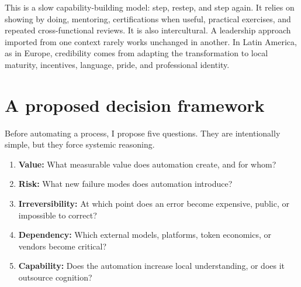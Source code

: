 \documentclass[11pt,a4paper]{article}
\begin{document}
This is a slow capability-building model: step, restep, and step again. It relies on showing by doing, mentoring, certifications when useful, practical exercises, and repeated cross-functional reviews. It is also intercultural. A leadership approach imported from one context rarely works unchanged in another. In Latin America, as in Europe, credibility comes from adapting the transformation to local maturity, incentives, language, pride, and professional identity.

\section{A proposed decision framework}
Before automating a process, I propose five questions. They are intentionally simple, but they force systemic reasoning.

\begin{enumerate}[leftmargin=*]
    \item \textbf{Value:} What measurable value does automation create, and for whom?
    \item \textbf{Risk:} What new failure modes does automation introduce?
    \item \textbf{Irreversibility:} At which point does an error become expensive, public, or impossible to correct?
    \item \textbf{Dependency:} Which external models, platforms, token economics, or vendors become critical?
    \item \textbf{Capability:} Does the automation increase local understanding, or does it outsource cognition?
\end{enumerate}
\end{document}

